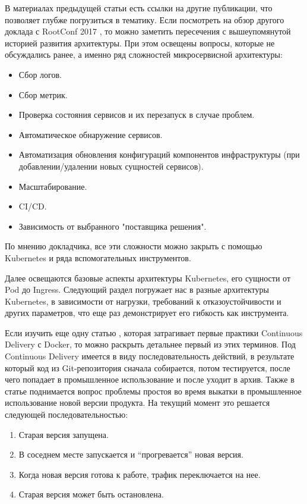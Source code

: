 В материалах предыдущей статьи есть ссылки на другие публикации, что позволяет глубже погрузиться в тематику. Если посмотреть на обзор другого доклада с RootConf 2017 \cite{habr:flant:k8s-small-projects}, то можно заметить пересечения с вышеупомянутой историей развития архитектуры. При этом освещены вопросы, которые не обсуждались ранее, а именно ряд сложностей микросервисной архитектуры:
\begin{itemize}
    \item Сбор логов.
    \item Сбор метрик.
    \item Проверка состояния сервисов и их перезапуск в случае проблем.
    \item Автоматическое обнаружение сервисов.
    \item Автоматизация обновления конфигураций компонентов инфраструктуры (при добавлении/удалении новых сущностей сервисов).
    \item Масштабирование.
    \item CI/CD.
    \item Зависимость от выбранного "поставщика решения".
\end{itemize}

По мнению докладчика, все эти сложности можно закрыть с помощью Kubernetes и ряда вспомогательных инструментов.

Далее освещаются базовые аспекты архитектуры Kubernetes, его сущности от Pod до Ingress. Следующий раздел погружает нас в разные архитектуры Kubernetes, в зависимости от нагрузки, требований к отказоустойчивости и других параметров, что еще раз демонстрирует его гибкость как инструмента.

Если изучить еще одну статью \cite{habr:flant:cd-docker}, которая затрагивает первые практики Continuous Delivery с Docker, то можно раскрыть детальнее первый из этих терминов. Под Continuous Delivery имеется в виду последовательность действий, в результате который код из Git-репозитория сначала собирается, потом тестируется, после чего попадает в промышленное использование и после уходит в архив. Также в статье поднимается вопрос проблемы простоя во время выкатки в промышленное использование новой версии продукта. На текущий момент это решается следующей последовательностью:
\begin{enumerate}
    \item Старая версия запущена.
    \item В соседнем месте запускается и “прогревается” новая версия.
    \item Когда новая версия готова к работе, трафик переключается на нее.
    \item Старая версия может быть остановлена.
\end{enumerate}

